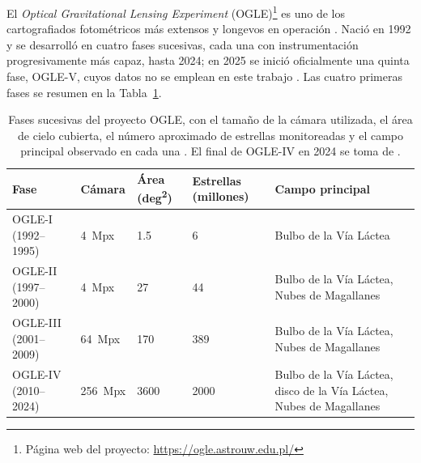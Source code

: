 \documentclass[12pt,letterpaper,oneside]{book}
\begin{document}
El \emph{Optical Gravitational Lensing Experiment} (OGLE)\footnote{P\'agina web del proyecto: \url{https://ogle.astrouw.edu.pl/}} es uno de los cartografiados fotom\'etricos m\'as extensos y longevos en operaci\'on \citep{soszynski_2024}. Naci\'o en 1992 y se desarroll\'o en cuatro fases sucesivas, cada una con instrumentaci\'on progresivamente m\'as capaz, hasta 2024; en 2025 se inici\'o oficialmente una quinta fase, OGLE-V, cuyos datos no se emplean en este trabajo \citep{iwanek_2025}. Las cuatro primeras fases se resumen en la Tabla~\ref{tab:ogle-fases}.

\begin{table}[H]
	\centering
	\begin{tabular}{p{2.8cm}p{1.6cm}p{1.6cm}p{2.0cm}p{3.9cm}}
		\hline
		\textbf{Fase} & \textbf{C\'amara} & \textbf{\'Area (deg\textsuperscript{2})} & \textbf{Estrellas (millones)} & \textbf{Campo principal} \\
		\hline
		OGLE-I \newline (1992--1995) & 4~Mpx & 1.5 & 6 & Bulbo de la V\'ia L\'actea \\
		OGLE-II \newline (1997--2000) & 4~Mpx & 27 & 44 & Bulbo de la V\'ia L\'actea, Nubes de Magallanes \\
		OGLE-III \newline (2001--2009) & 64~Mpx & 170 & 389 & Bulbo de la V\'ia L\'actea, Nubes de Magallanes \\
		OGLE-IV \newline (2010--2024) & 256~Mpx & 3600 & 2000 & Bulbo de la V\'ia L\'actea, disco de la V\'ia L\'actea, Nubes de Magallanes \\
		\hline
	\end{tabular}
	\caption[Fases del proyecto OGLE]{Fases sucesivas del proyecto OGLE, con el tama\~no de la c\'amara utilizada, el \'area de cielo cubierta, el n\'umero aproximado de estrellas monitoreadas y el campo principal observado en cada una \citep{soszynski_2024}. El final de OGLE-IV en 2024 se toma de \citet{iwanek_2025}.}
	\label{tab:ogle-fases}
\end{table}
\end{document}
